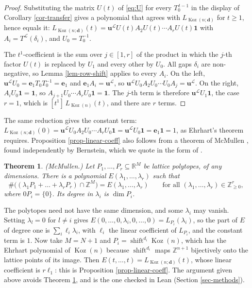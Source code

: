 \documentclass[11pt, a4paper, abstract=yes]{scrartcl}
\theoremstyle{definition}
\theoremstyle{remark}
\theoremstyle{plain}
\newtheorem{theorem}[definition]{Theorem}
\newcommand{\vek}[1]{\boldsymbol{#1}}
\theoremstyle{remark}
\theoremstyle{plain}
\newcommand{\Koz}{\operatorname{Koz}}
\newcommand{\shift}{\operatorname{shift}}
\let\autocite\cite
\begin{document}
\begin{proof}
Substituting the matrix \(U(t)\) of \eqref{eq:U} for every \(T_0^{\,t-1}\) in the
display of Corollary \ref{cor-transfer} gives a polynomial that agrees with \(L_{\Koz(n;\vek d)}\) for
\(t\ge1\), hence equals it:
\(L_{\Koz(n;\vek d)}(t)=\vek u^{\mathcal L}U(t)A_2U(t)\cdots A_rU(t)\vek 1\) with
\(A_i=T^{\mathcal L}(\delta_i)\), and \(U_0=T_0^{-1}\).

The \(t^1\)-coefficient is the sum over \(j\in[1,r]\) of the product in which the \(j\)-th factor
\(U(t)\) is replaced by \(U_1\) and every other by \(U_0\). All gaps \(\delta_i\) are non-negative,
so Lemma \ref{lem-row-shift} applies to every \(A_i\). On the left,
\(\vek u^{\mathcal L}U_0=\vek e_1T_0T_0^{-1}=\vek e_1\) and \(\vek e_1A_i=\vek u^{\mathcal L}\), so
\(\vek u^{\mathcal L}U_0A_2U_0\cdots U_0A_j=\vek u^{\mathcal L}\). On the right, \(A_iU_0\vek 1=\vek 1\),
so \(A_{j+1}U_0\cdots A_rU_0\vek 1=\vek 1\). The \(j\)-th term is therefore
\(\vek u^{\mathcal L}U_1\vek 1\), the case \(r=1\), which is \([t^1]\,L_{\Koz(n)}(t)\), and there are
\(r\) terms.
\end{proof}

The same reduction gives the constant term:
\(L_{\Koz(n;\vek d)}(0)=\vek u^{\mathcal L}U_0A_2U_0\cdots A_rU_0\vek 1=\vek u^{\mathcal L}U_0\vek 1=\vek e_1\vek 1=1\),
as Ehrhart's theorem requires. Proposition \ref{prop-linear-coeff} also follows from a theorem of
McMullen \autocite{McMullen1977}, found independently by Bernstein, which we quote in the form of
\autocite[Theorem 2.3]{HaaseJuhnkeSanyalTheobald2017}.

\begin{theorem}
(\emph{McMullen}.) Let \(P_1,\dots,P_r\subseteq\mathbb R^M\) be lattice polytopes, of any dimensions. There is
a polynomial \(E(\lambda_1,\dots,\lambda_r)\) such that
\[
  \#\bigl((\lambda_1P_1+\dots+\lambda_rP_r)\cap\mathbb Z^M\bigr)=E(\lambda_1,\dots,\lambda_r)
  \qquad\text{for all }(\lambda_1,\dots,\lambda_r)\in\mathbb Z_{\ge0}^r,
\]
where \(0P_i=\lbrace0\rbrace\). Its degree in \(\lambda_i\) is \(\dim P_i\).
\label{thm-mcmullen}
\end{theorem}

The polytopes need not have the same dimension, and some \(\lambda_i\) may vanish. Setting
\(\lambda_l=0\) for \(l\ne i\) gives \(E(0,\dots,0,\lambda_i,0,\dots,0)=L_{P_i}(\lambda_i)\), so the part of
\(E\) of degree one is \(\sum_i\ell_i\lambda_i\), with \(\ell_i\) the linear coefficient of \(L_{P_i}\),
and the constant term is \(1\). Now take \(M=N+1\) and \(P_i=\shift^{d_i}\Koz(n)\), which has the
Ehrhart polynomial of \(\Koz(n)\) because \(\shift^{d_i}\) maps \(\mathbb Z^{n+1}\) bijectively onto the
lattice points of its image. Then \(E(t,\dots,t)=L_{\Koz(n;\vek d)}(t)\), whose linear coefficient is
\(r\ell_1\): this is Proposition \ref{prop-linear-coeff}. The argument given above avoids
Theorem \ref{thm-mcmullen}, and is the one checked in Lean (Section \ref{sec-methods}).
\end{document}
